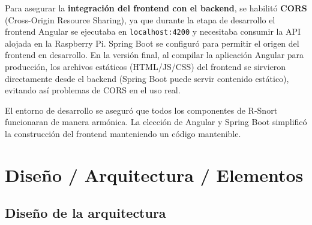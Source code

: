 \documentclass[11pt,a4paper,twoside]{report}
\begin{document}
Para asegurar la \textbf{integración del frontend con el backend}, se habilitó \textbf{CORS} (Cross-Origin Resource Sharing), ya que durante la etapa de desarrollo el frontend Angular se ejecutaba en \texttt{localhost:4200} y necesitaba consumir la API alojada en la Raspberry Pi. Spring Boot se configuró para permitir el origen del frontend en desarrollo. En la versión final, al compilar la aplicación Angular para producción, los archivos estáticos (HTML/JS/CSS) del frontend se sirvieron directamente desde el backend (Spring Boot puede servir contenido estático), evitando así problemas de CORS en el uso real.\newline

El entorno de desarrollo se aseguró que todos los componentes de R-Snort funcionaran de manera armónica. La elección de Angular y Spring Boot simplificó la construcción del frontend manteniendo un código mantenible.

\section{Diseño / Arquitectura / Elementos}

\subsection{Diseño de la arquitectura}
\end{document}
